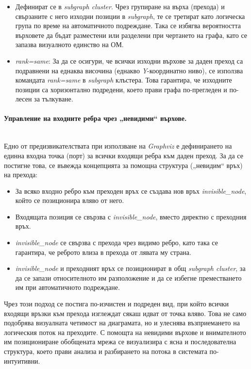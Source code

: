 \begin{itemize}
    \item Дефинират се в \textit{subgraph cluster}. Чрез групиране на върха (прехода) и свързаните с него изходни позиции в \textit{subgraph}, те се  третират като логическа група по време на автоматичното подреждане. Така се избягва вероятността върховете да бъдат разместени или разделени при чертането на графа, като се запазва визуалното единство на ОМ.
    \item \textit{rank=same}: За да се осигури, че всички изходни върхове за даден преход са подравнени на еднаква височина (еднакво \textit{Y}-координатно ниво), се използва командата \textit{rank=same} в \textit{subgraph} клъстера. Това гарантира, че изходните позиции са хоризонтално подредени, което прави графа по-прегледен и по-лесен за тълкуване.
\end{itemize}

\paragraph{Управление на входните ребра чрез „невидими“ върхове.}
\mbox{}\\
Едно от предизвикателствата при използване на \textit{Graphviz} е дефинирането на единна входна точка (порт) за всички входящи ребра към даден преход. За да се постигне това, се въвежда концепцията за помощна структура („невидим“ връх) на прехода:

\begin{itemize}
    \item За всяко входно ребро към преходен връх се създава нов връх \textit{invisible\_node}, който се позиционира вляво от него.
    \item Входящата позиция се свързва с \textit{invisible\_node}, вместо директно с преходния връх.
    \item \textit{invisible\_node} се свързва с прехода чрез видимо ребро, като така се гарантира, че реброто влиза в прехода от лявата му страна.
    \item \textit{invisible\_node} и преходният връх се позиционират в общ \textit{subgraph cluster}, за да се запази относителното им разположение и да се избегне преместването им при автоматичното подреждане.
\end{itemize}

Чрез този подход се постига по-изчистен и подреден вид, при който всички входящи връзки към прехода изглеждат сякаш идват от точка вляво. Това не само подобрява визуалната четимост на диаграмата, но и улеснява възприемането на логическия поток на преходите. С помощта на невидими върхове и внимателното им позициониране обобщената мрежа се визуализира с ясна и последователна структура, което прави анализа и разбирането на потока в системата по-интуитивни.

